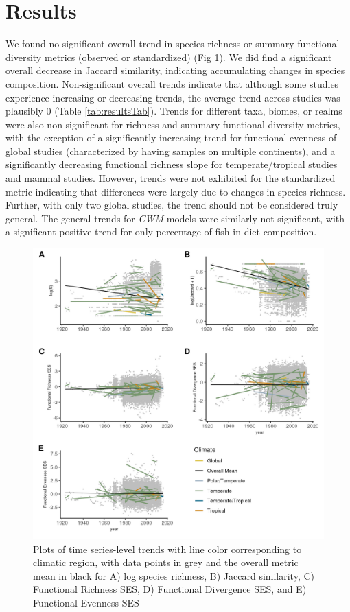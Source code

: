 \documentclass{article}
\begin{document}
\hypertarget{results}{%
\section{Results}\label{results}}

We found no significant overall trend in species richness or summary
functional diversity metrics (observed or standardized) (Fig
\ref{fig:timeseriesPlot}). We did find a significant overall decrease in
Jaccard similarity, indicating accumulating changes in species
composition. Non-significant overall trends indicate that although some
studies experience increasing or decreasing trends, the average trend
across studies was plausibly 0 (Table \ref{tab:resultsTab}). Trends for
different taxa, biomes, or realms were also non-significant for richness
and summary functional diversity metrics, with the exception of a
significantly increasing trend for functional evenness of global studies
(characterized by having samples on multiple continents), and a
significantly decreasing functional richness slope for
temperate/tropical studies and mammal studies. However, trends were not
exhibited for the standardized metric indicating that differences were
largely due to changes in species richness. Further, with only two
global studies, the trend should not be considered truly general. The
general trends for \emph{CWM} models were similarly not significant,
with a significant positive trend for only percentage of fish in diet
composition.

\begin{figure}
\includegraphics[width=\textwidth]{../../figures/3met_long} \caption{Plots of time series-level trends with line color corresponding to climatic region, with data points in grey and the overall metric mean in black for A) log species richness, B) Jaccard similarity, C) Functional Richness SES, D) Functional Divergence SES, and E) Functional Evenness SES}\label{fig:timeseriesPlot}
\end{figure}
\end{document}
